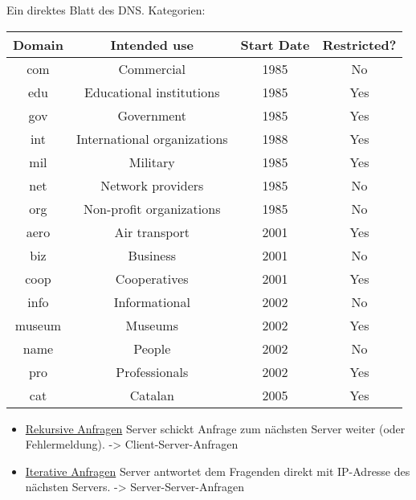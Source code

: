 Ein direktes Blatt des DNS. Kategorien:
\begin{center}
    \begin{tabular}{|c|c|c|c|}
        \hline
        Domain & Intended use                & Start Date & Restricted? \\
        \hline
        com    & Commercial                  & 1985       & No          \\
        \hline
        edu    & Educational institutions    & 1985       & Yes         \\
        \hline
        gov    & Government                  & 1985       & Yes         \\
        \hline
        int    & International organizations & 1988       & Yes         \\
        \hline
        mil    & Military                    & 1985       & Yes         \\
        \hline
        net    & Network providers           & 1985       & No          \\
        \hline
        org    & Non-profit organizations    & 1985       & No          \\
        \hline
        aero   & Air transport               & 2001       & Yes         \\
        \hline
        biz    & Business                    & 2001       & No          \\
        \hline
        coop   & Cooperatives                & 2001       & Yes         \\
        \hline
        info   & Informational               & 2002       & No          \\
        \hline
        museum & Museums                     & 2002       & Yes         \\
        \hline
        name   & People                      & 2002       & No          \\
        \hline
        pro    & Professionals               & 2002       & Yes         \\
        \hline
        cat    & Catalan                     & 2005       & Yes         \\
        \hline
    \end{tabular}

\end{center}

\begin{itemize}
    \item \underline{Rekursive Anfragen} Server schickt Anfrage zum nächsten Server weiter (oder Fehlermeldung). -> Client-Server-Anfragen
    \item \underline{Iterative Anfragen} Server antwortet dem Fragenden direkt mit IP-Adresse des nächsten Servers. -> Server-Server-Anfragen
\end{itemize}

